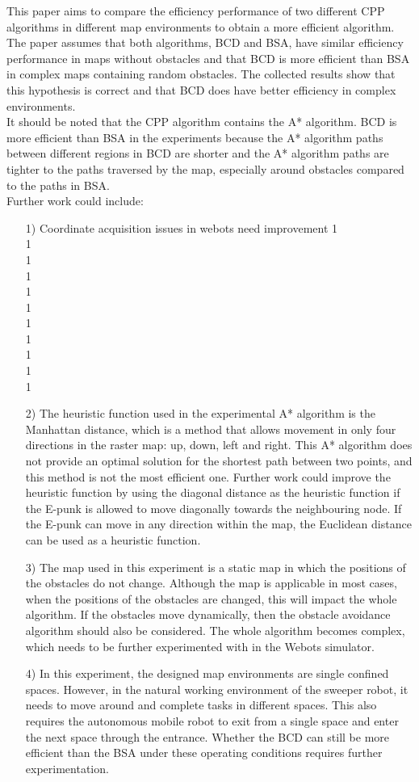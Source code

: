 \documentclass[conference]{IEEEtran}
\begin{document}
This paper aims to compare the efficiency performance of two different CPP algorithms in different map environments to obtain a more efficient algorithm. The paper assumes that both algorithms, BCD and BSA, have similar efficiency performance in maps without obstacles and that BCD is more efficient than BSA in complex maps containing random obstacles. The collected results show that this hypothesis is correct and that BCD does have better efficiency in complex environments.\\
It should be noted that the CPP algorithm contains the A* algorithm. BCD is more efficient than BSA in the experiments because the A* algorithm paths between different regions in BCD are shorter and the A* algorithm paths are tighter to the paths traversed by the map, especially around obstacles compared to the paths in BSA.\\
Further work could include:
\begin{itemize}
  \item [1)] 
    Coordinate acquisition issues in webots need improvement
    1\\
    1\\
    1\\
    1\\
    1\\
    1\\
    1\\
    1\\
    1\\
    1\\
    1
  \item [2)]
    The heuristic function used in the experimental A* algorithm is the Manhattan distance, which is a method that allows movement in only four directions in the raster map: up, down, left and right. This A* algorithm does not provide an optimal solution for the shortest path between two points, and this method is not the most efficient one. Further work could improve the heuristic function by using the diagonal distance as the heuristic function if the E-punk is allowed to move diagonally towards the neighbouring node. If the E-punk can move in any direction within the map, the Euclidean distance can be used as a heuristic function.
  \item [3)]
    The map used in this experiment is a static map in which the positions of the obstacles do not change. Although the map is applicable in most cases, when the positions of the obstacles are changed, this will impact the whole algorithm. If the obstacles move dynamically, then the obstacle avoidance algorithm should also be considered. The whole algorithm becomes complex, which needs to be further experimented with in the Webots simulator.
  \item [4)]
    In this experiment, the designed map environments are single confined spaces. However, in the natural working environment of the sweeper robot, it needs to move around and complete tasks in different spaces. This also requires the autonomous mobile robot to exit from a single space and enter the next space through the entrance. Whether the BCD can still be more efficient than the BSA under these operating conditions requires further experimentation.
\end{itemize}



 

\end{document}
